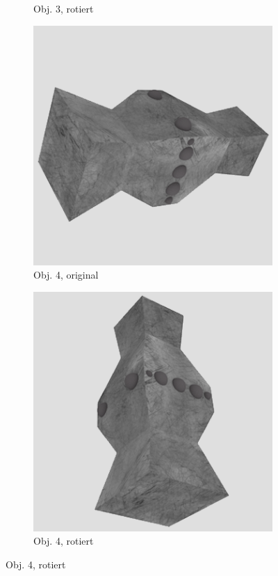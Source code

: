 \begin{figure}
\begin{subfigure}{0.2\textwidth}
\caption{Obj. 3, rotiert} \label{fig:d}
\end{subfigure} \hspace{.5cm}%
\begin{subfigure}{0.2\textwidth}
\includegraphics[width=\linewidth]{Bilder/Objekt4A.png}
\caption{Obj. 4, original} \label{fig:e}
\end{subfigure}\hspace{.5cm}
\begin{subfigure}{0.2\textwidth}
\includegraphics[width=\linewidth]{Bilder/Objekt4B.png}
\caption{Obj. 4, rotiert} \label{fig:f}
\end{subfigure}\hspace{.5cm}


\end{figure}
